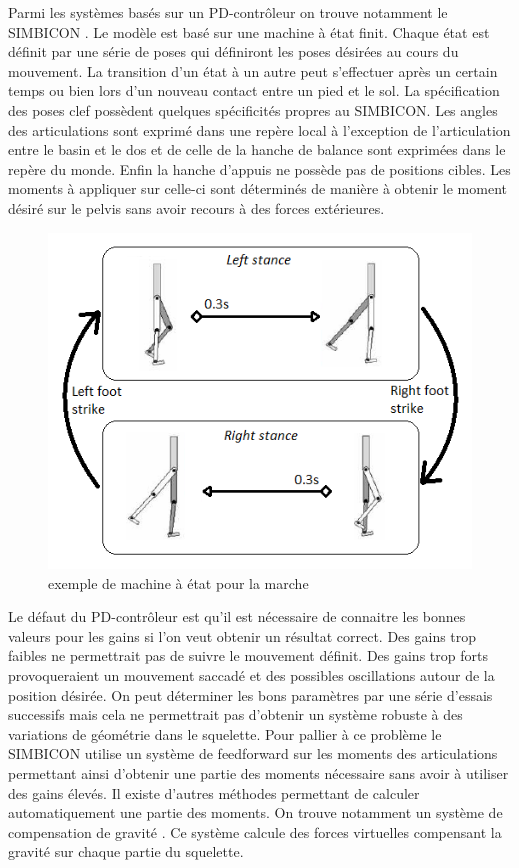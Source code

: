 \documentclass{llncs}
\begin{document}
Parmi les systèmes basés sur un PD-contrôleur on trouve notamment le SIMBICON \cite{yin2007simbicon}. Le modèle est basé sur une machine à état finit. Chaque état est définit par une série de poses qui définiront les poses désirées au cours du mouvement. La transition d'un état à un autre peut s'effectuer après un certain temps ou bien lors d'un nouveau contact entre un pied et le sol. La spécification des poses clef possèdent quelques spécificités propres au SIMBICON. Les angles des articulations sont exprimé dans une repère local à l'exception de l'articulation entre le basin et le dos et de celle de la hanche de balance sont exprimées dans le repère du monde. Enfin la hanche d'appuis ne possède pas de positions cibles. Les moments à appliquer sur celle-ci sont déterminés de manière à obtenir le moment désiré sur le pelvis sans avoir recours à des forces extérieures.
\begin{figure}[h]
\centering
\includegraphics[scale=0.5]{state_machine.png}
\caption{exemple de machine à état pour la marche \cite{yin2007simbicon}}
\label{fig:state_machine}
\end{figure}


Le défaut du PD-contrôleur est qu'il est nécessaire de connaitre les bonnes valeurs pour les gains si l'on veut obtenir un résultat correct. Des gains trop faibles ne permettrait pas de suivre le mouvement définit. Des gains trop forts provoqueraient un mouvement saccadé et des possibles oscillations autour de la position désirée. On peut déterminer les bons paramètres par une série d'essais successifs mais cela ne permettrait pas d'obtenir un système robuste à des variations de géométrie dans le squelette. Pour pallier à ce problème le SIMBICON utilise un système de feedforward \cite{yin2007simbicon} sur les moments des articulations permettant ainsi d'obtenir une partie des moments nécessaire sans avoir à utiliser des gains élevés. Il existe d'autres méthodes permettant de calculer automatiquement une partie des moments. On trouve notamment un système de compensation de gravité \cite{coros2010generalized}. Ce système calcule des forces virtuelles compensant la gravité sur chaque partie du squelette.
\end{document}

